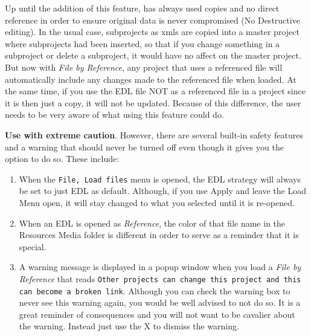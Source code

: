 Up until the addition of this feature, \CGG{} has always used copies
and no direct reference in order to ensure original data is never
compromised (No Destructive editing).  In the usual case, subprojects as xmls are copied into
a master project where subprojects had been inserted, so that if you
change something in a subproject or delete a subproject, it would
have no affect on the master project.  But now with \textit{File by
	Reference}, any project that uses a referenced file will
automatically include any changes made to the referenced file when
loaded.  At the same time, if you use the EDL file NOT as a
referenced file in a project since it is then just a copy, it will
not be updated.  Because of this difference, the user needs to be
very aware of what using this feature could do.

\textbf{Use with extreme caution}.  However, there are several
built-in safety features and a warning that should never be turned
off even though it gives you the option to do so.  These include:

\begin{enumerate}
	\item When the \texttt{File, Load files} menu is opened, the EDL
	strategy will always be set to just EDL as default.  Although, if
	you use Apply and leave the Load Menu open, it will stay changed to
	what you selected until it is re-opened.
	\item When an EDL is opened as \textit{Reference}, the color of
	that file name in the Resources Media folder is different in order
	to serve as a reminder that it is special.
	\item A warning message is displayed in a popup window when you
	load a \textit{File by Reference} that reads \texttt{Other projects can
	change this project and this can become a broken link}.  Although
	you can check the warning box to never see this warning again, you
	would be well advised to not do so.  It is a great reminder of
	consequences and you will not want to be cavalier about the warning.
	Instead just use the X to dismiss the warning.
\end{enumerate}

